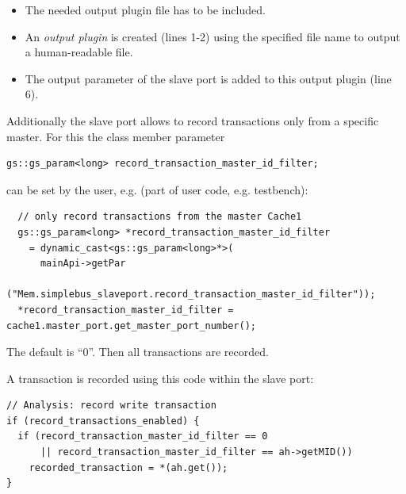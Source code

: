 \begin{itemize}
	\item  The needed output plugin file has to be included.
	\item  An {\em output plugin} is created (lines 1-2) using the specified file name to output a human-readable file.
	\item  The output parameter of the slave port is added to this output plugin (line 6).
\end{itemize}

Additionally the slave port allows to record transactions only from a specific master. For this the class member parameter
\begin{lstlisting}
gs::gs_param<long> record_transaction_master_id_filter;
\end{lstlisting}
can be set by the user, e.g. (part of user code, e.g. testbench):
\begin{lstlisting}
  // only record transactions from the master Cache1
  gs::gs_param<long> *record_transaction_master_id_filter 
    = dynamic_cast<gs::gs_param<long>*>(
      mainApi->getPar
        ("Mem.simplebus_slaveport.record_transaction_master_id_filter"));
  *record_transaction_master_id_filter = cache1.master_port.get_master_port_number();
\end{lstlisting}
The default is ``0''. Then all transactions are recorded.

A transaction is recorded using this code within the slave port:
\begin{lstlisting}
// Analysis: record write transaction
if (record_transactions_enabled) {
  if (record_transaction_master_id_filter == 0
      || record_transaction_master_id_filter == ah->getMID())
    recorded_transaction = *(ah.get());
}                  
\end{lstlisting}
